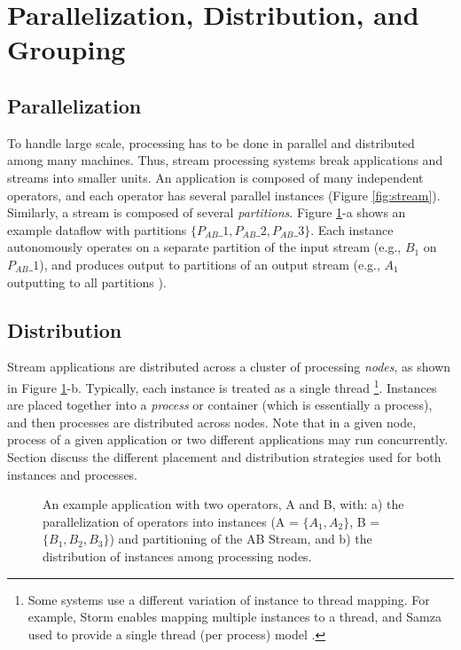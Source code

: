 \section{Parallelization, Distribution, and Grouping}
\label{sec:parallelization}

\subsection{Parallelization}
 To handle large scale, processing has to be done in parallel and distributed among many machines. Thus, stream processing systems break applications and streams into smaller units. An application is composed of many independent operators, and each operator has several parallel instances (Figure \ref{fig:stream}). Similarly, a stream is composed of several \textit{partitions}. Figure \ref{fig:parallelization}-a shows an example dataflow with partitions $\{P_{AB}\_1, P_{AB}\_2, P_{AB}\_3\}$. 
Each instance autonomously operates on a separate partition of the input stream (e.g., $B_1$ on $P_{AB}\_1$), and produces output to partitions of an output stream (e.g., $A_1$ outputting to all partitions ). 

\subsection{Distribution} 
Stream applications are distributed across a cluster of processing \textit{nodes}, as shown in Figure \ref{fig:parallelization}-b. Typically, each instance is treated as a single thread \footnote{Some systems use a different variation of instance to thread mapping. For example, Storm enables mapping multiple instances to a thread, and Samza used to provide a single thread (per process) model .}. 
Instances are placed together into a \textit{process} or container (which is essentially a process), and then processes are distributed across nodes. Note that in a given node, process of a given application or two different applications may run concurrently. 
Section  discuss the different placement and distribution strategies used for both instances and processes. 
	
\begin{figure}[t]
	\centering
	\hspace*{1cm}
	\caption{An example application with two operators, A and B, with: a) the parallelization of operators into instances (A = $\{A_1, A_2\}$, B =$\{B_1, B_2, B_3\}$) and partitioning of the AB Stream, and b) the distribution of instances among processing nodes.}
\label{fig:parallelization}
	
\end{figure}

